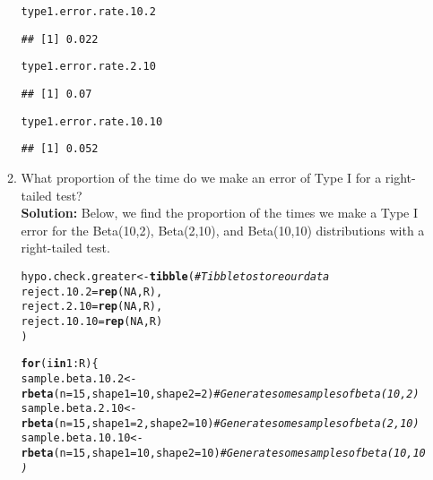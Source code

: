 \documentclass{article}\usepackage[]{graphicx}\usepackage[]{xcolor}
\makeatletter
\newcommand{\hlnum}[1]{\textcolor[rgb]{0.686,0.059,0.569}{#1}}%
\newcommand{\hlcom}[1]{\textcolor[rgb]{0.678,0.584,0.686}{\textit{#1}}}%
\newcommand{\hlopt}[1]{\textcolor[rgb]{0,0,0}{#1}}%
\newcommand{\hldef}[1]{\textcolor[rgb]{0.345,0.345,0.345}{#1}}%
\newcommand{\hlkwa}[1]{\textcolor[rgb]{0.161,0.373,0.58}{\textbf{#1}}}%
\newcommand{\hlkwb}[1]{\textcolor[rgb]{0.69,0.353,0.396}{#1}}%
\newcommand{\hlkwc}[1]{\textcolor[rgb]{0.333,0.667,0.333}{#1}}%
\newcommand{\hlkwd}[1]{\textcolor[rgb]{0.737,0.353,0.396}{\textbf{#1}}}%
\newenvironment{kframe}{%
 \def\at@end@of@kframe{}%
 \ifinner\ifhmode%
  \def\at@end@of@kframe{\end{minipage}}%
  \begin{minipage}{\columnwidth}%
 \fi\fi%
 \def\FrameCommand##1{\hskip\@totalleftmargin \hskip-\fboxsep
 \colorbox{shadecolor}{##1}\hskip-\fboxsep
     \hskip-\linewidth \hskip-\@totalleftmargin \hskip\columnwidth}%
 \MakeFramed {\advance\hsize-\width
   \@totalleftmargin\z@ \linewidth\hsize
   \@setminipage}}%
 {\par\unskip\endMakeFramed%
 \at@end@of@kframe}
\newenvironment{knitrout}{}{} %
\makeatother
\begin{document}
\begin{enumerate}
\begin{enumerate}
\begin{knitrout}
\begin{kframe}
\begin{alltt}
\hldef{type1.error.rate.10.2}
\end{alltt}
\begin{verbatim}
## [1] 0.022
\end{verbatim}
\begin{alltt}
\hldef{type1.error.rate.2.10}
\end{alltt}
\begin{verbatim}
## [1] 0.07
\end{verbatim}
\begin{alltt}
\hldef{type1.error.rate.10.10}
\end{alltt}
\begin{verbatim}
## [1] 0.052
\end{verbatim}
\end{kframe}
\end{knitrout}
    
    \item What proportion of the time do we make an error of Type I for a
    right-tailed test? \\
    \textbf{Solution:} Below, we find the proportion of the times we make a Type I error for the Beta(10,2), Beta(2,10), and Beta(10,10) distributions with a right-tailed test.
\begin{knitrout}\scriptsize
{}\color{fgcolor}\begin{kframe}
\begin{alltt}
\hldef{hypo.check.greater} \hlkwb{<-} \hlkwd{tibble}\hldef{(} \hlcom{#Tibble to store our data}
  \hlkwc{reject.10.2} \hldef{=} \hlkwd{rep}\hldef{(}\hlnum{NA}\hldef{, R),}
  \hlkwc{reject.2.10} \hldef{=} \hlkwd{rep}\hldef{(}\hlnum{NA}\hldef{, R),}
  \hlkwc{reject.10.10} \hldef{=} \hlkwd{rep}\hldef{(}\hlnum{NA}\hldef{, R)}
\hldef{)}

\hlkwa{for} \hldef{(i} \hlkwa{in} \hlnum{1}\hlopt{:}\hldef{R)\{}
  \hldef{sample.beta.10.2} \hlkwb{<-} \hlkwd{rbeta}\hldef{(}\hlkwc{n} \hldef{=} \hlnum{15}\hldef{,} \hlkwc{shape1} \hldef{=} \hlnum{10}\hldef{,} \hlkwc{shape2} \hldef{=} \hlnum{2}\hldef{)} \hlcom{#Generate some samples of beta (10,2)}
  \hldef{sample.beta.2.10} \hlkwb{<-} \hlkwd{rbeta}\hldef{(}\hlkwc{n} \hldef{=} \hlnum{15}\hldef{,} \hlkwc{shape1} \hldef{=} \hlnum{2}\hldef{,} \hlkwc{shape2} \hldef{=} \hlnum{10}\hldef{)} \hlcom{#Generate some samples of beta (2,10)}
  \hldef{sample.beta.10.10} \hlkwb{<-} \hlkwd{rbeta}\hldef{(}\hlkwc{n}\hldef{=} \hlnum{15}\hldef{,} \hlkwc{shape1} \hldef{=} \hlnum{10}\hldef{,} \hlkwc{shape2} \hldef{=} \hlnum{10}\hldef{)} \hlcom{#Generate some samples of beta (10,10)}


\end{alltt}
\end{kframe}
\end{knitrout}
\end{enumerate}
\end{enumerate}
\end{document}
